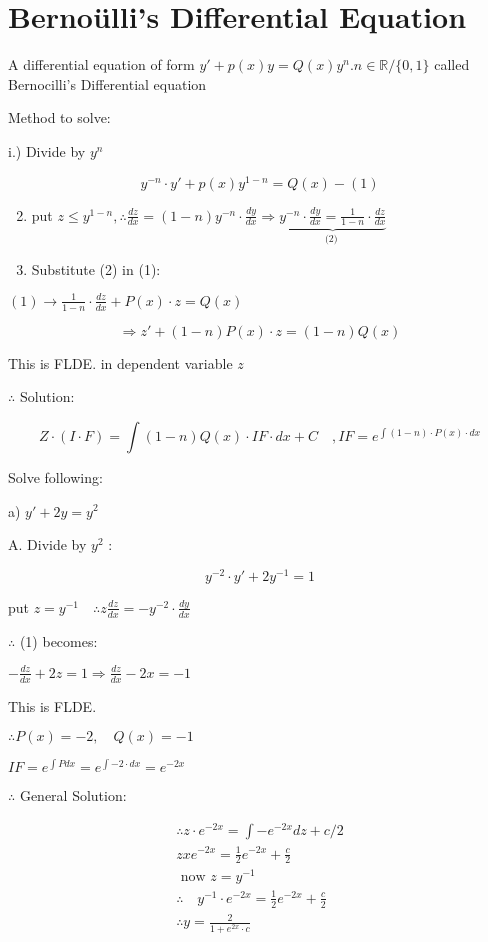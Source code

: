 \section*{Bernoülli's Differential Equation}
A differential equation of form $y'+p(x) y=Q(x) y^{n} . n \in \mathbb{R} /\{0,1\}$ called Bernocilli's Differential equation

Method to solve:

i.) Divide by $y^{n}$

$$
	y^{-n} \cdot y'+p(x) y^{1-n}=Q(x)-(1)
$$

\begin{enumerate}
	\setcounter{enumi}{1}
	\item put $z \leq y^{1-n}, \therefore \frac{d z}{d x}=(1-n) y^{-n} \cdot \frac{d y}{d x} \Rightarrow \underbrace{y^{-n} \cdot \frac{d y}{d x}=\frac{1}{1-n} \cdot \frac{d z}{d x}}_{\text{(2) }}$

	\item Substitute (2) in (1):

\end{enumerate}

$(1) \rightarrow \frac{1}{1-n} \cdot \frac{d z}{d x}+P(x) \cdot z=Q(x)$

$$
	\Rightarrow z'+(1-n) P(x) \cdot z=(1-n) Q(x)
$$

This is FLDE. in dependent variable $z$

$\therefore$ Solution:

$$
	Z \cdot(I \cdot F)=\int(1-n) Q(x) \cdot I F \cdot d x+C \quad, I F=e^{\int(1-n) \cdot P(x) \cdot d x}
$$

Solve following:

a) $y'+2 y=y^2$

A. Divide by $y^2$ :

$$
	y^{-2} \cdot y'+2 y^{-1}=1
$$

put $z=y^{-1} \quad \therefore z \frac{d z}{d x}=-y^{-2} \cdot \frac{d y}{d x}$

$\therefore$ (1) becomes:

$-\frac{d z}{d x}+2 z=1 \Rightarrow \frac{d z}{d x}-2 x=-1$

This is FLDE.

$\therefore P(x)=-2, \quad Q(x)=-1$

$I F=e^{\int P d x}=e^{\int-2 \cdot d x}=e^{-2 x}$

$\therefore$ General Solution:

$$
	\begin{gathered}
		\therefore z \cdot e^{-2 x}=\int-e^{-2 x} d z+c / 2 \\
		z x e^{-2 x}=\frac{1}{2} e^{-2 x}+\frac{c}{2} \\
		\text{ now } z=y^{-1} \\
		\therefore \quad y^{-1} \cdot e^{-2 x}=\frac{1}{2} e^{-2 x}+\frac{c}{2} \\
		\therefore y=\frac{2}{1+e^{2 x} \cdot c}
	\end{gathered}
$$

